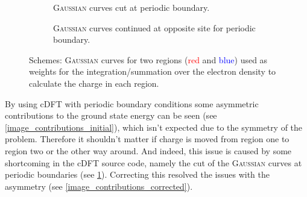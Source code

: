 \begin{figure}
	\centering
	\begin{subfigure}{0.45\textwidth}
		\centering
		\caption{\textsc{Gaussian} curves cut at periodic boundary.\\}
	\end{subfigure}\hspace*{1cm}
	\begin{subfigure}{0.45\textwidth}
		\centering
		\caption{\textsc{Gaussian} curves continued at opposite site for periodic boundary.}
	\end{subfigure}
	\caption[Schemes: \textsc{Gaussian} curves from cDFT with periodic boundary conditions.]{Schemes: \textsc{Gaussian} curves for two regions (\textcolor{red}{red} and \textcolor{blue}{blue}) used as weights for the integration/summation over the electron density to calculate the charge in each region.}
	\label{image_periodicity_gaussians}
\end{figure}
By using cDFT with periodic boundary conditions some asymmetric contributions to the ground state energy can be seen (see \cref{image_contributions_initial}), which isn't expected due to the symmetry of the problem. \newpage Therefore it shouldn't matter if charge is moved from region one to region two or the other way around. And indeed, this issue is caused by some shortcoming in the cDFT source code, namely the cut of the \textsc{Gaussian} curves at periodic boundaries (see \cref{image_periodicity_gaussians}). Correcting this resolved the issues with the asymmetry (see \cref{image_contributions_corrected}).\\
